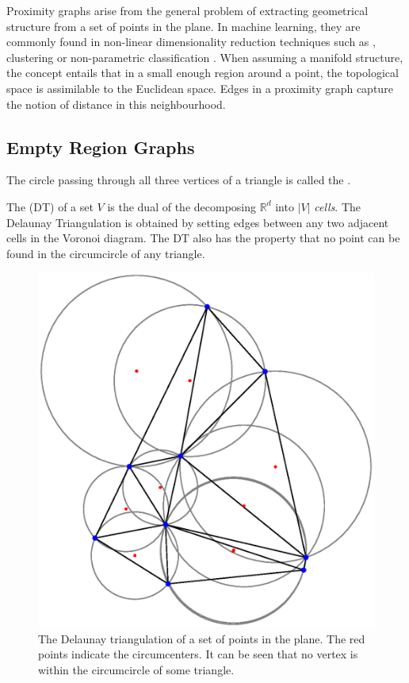 Proximity graphs arise from the general problem of extracting geometrical structure from a set of points in the plane. In machine learning, they are commonly found in non-linear dimensionality reduction techniques such as \cite{Tenenbaum2000, Roweis2000}, clustering \cite{Luxburg2007} or non-parametric classification \cite{Toussaint2012}. When assuming a manifold structure, the concept entails that in a small enough region around a point, the topological space is assimilable to the Euclidean space. Edges in a proximity graph capture the notion of distance in this neighbourhood. 

\subsection{Empty Region Graphs}

\begin{defn}
The circle passing through all three vertices of a triangle is called the .
\end{defn}

\begin{defn}
The  (DT) of a set $V$ is the dual of the  decomposing $\mathbb{R}^d$ into $|V|$ \textit{cells}. The Delaunay Triangulation is obtained by setting edges between any two adjacent cells in the Voronoi diagram. The DT also has the property that no point can be found in the circumcircle of any triangle. 
\end{defn}

\begin{figure}
\centering
\includegraphics[scale=0.5]{fig/Delaunay-circle.eps}
\caption{The Delaunay triangulation of a set of points in the plane. The red points indicate the circumcenters. It can be seen that no vertex is within the circumcircle of some triangle.}
\label{fig:delaunay}
\end{figure}

